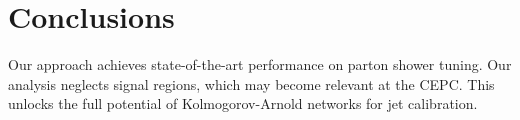 \section{Conclusions}\label{sec:conclusions}

Our approach achieves state-of-the-art performance on parton shower
tuning. Our analysis neglects signal regions, which may become relevant
at the CEPC. This unlocks the full potential of Kolmogorov-Arnold
networks for jet calibration.

